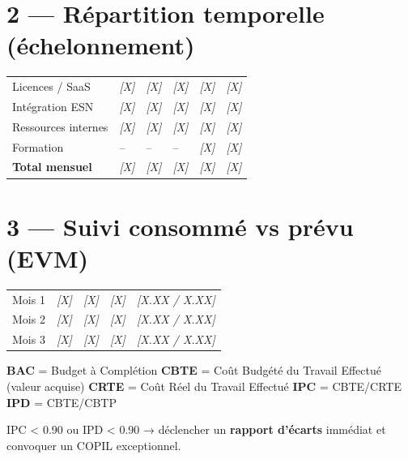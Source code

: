 \documentclass[11pt,a4paper,oneside]{report}
\begin{document}
\section*{2 — Répartition temporelle (échelonnement)}

\renewcommand{\arraystretch}{1.3}
\begin{tabularx}{\textwidth}{L{5cm} C{2cm} C{2cm} C{2cm} C{2cm} C{2cm}}
\toprule
{} &  &  &  &  &  \\
\midrule
Licences / SaaS      & \textit{[X]} & \textit{[X]} & \textit{[X]} & \textit{[X]} & \textit{[X]} \\
Intégration ESN      & \textit{[X]} & \textit{[X]} & \textit{[X]} & \textit{[X]} & \textit{[X]} \\
Ressources internes  & \textit{[X]} & \textit{[X]} & \textit{[X]} & \textit{[X]} & \textit{[X]} \\
Formation            & --           & --           & --           & \textit{[X]} & \textit{[X]} \\
\midrule
{}\textbf{Total mensuel} & \textit{[X]} & \textit{[X]} & \textit{[X]} & \textit{[X]} & \textit{[X]} \\
\bottomrule
\end{tabularx}

\section*{3 — Suivi consommé vs prévu (EVM)}

\renewcommand{\arraystretch}{1.3}
\begin{tabularx}{\textwidth}{L{4cm} C{2.5cm} C{2.5cm} C{2.5cm} Y}
\toprule
{} &  &  &  &  \\
\midrule
Mois 1 & \textit{[X]} & \textit{[X]} & \textit{[X]} & \textit{[X.XX / X.XX]} \\
Mois 2 & \textit{[X]} & \textit{[X]} & \textit{[X]} & \textit{[X.XX / X.XX]} \\
Mois 3 & \textit{[X]} & \textit{[X]} & \textit{[X]} & \textit{[X.XX / X.XX]} \\
\bottomrule
\end{tabularx}

\vspace{4pt}
{\footnotesize
\textbf{BAC} = Budget à Complétion \quad
\textbf{CBTE} = Coût Budgété du Travail Effectué (valeur acquise) \quad
\textbf{CRTE} = Coût Réel du Travail Effectué \quad
\textbf{IPC} = CBTE/CRTE \quad
\textbf{IPD} = CBTE/CBTP
}

\begin{reco}
IPC \textless{} 0.90 ou IPD \textless{} 0.90 → déclencher un \textbf{rapport d'écarts} immédiat et convoquer un COPIL exceptionnel.
\end{reco}
\end{document}

